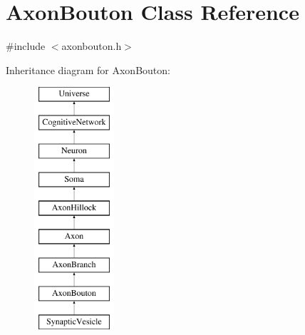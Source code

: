 \hypertarget{classAxonBouton}{}\section{Axon\+Bouton Class Reference}
\label{classAxonBouton}


{\ttfamily \#include $<$axonbouton.\+h$>$}

Inheritance diagram for Axon\+Bouton\+:\begin{figure}[H]
\begin{center}
\leavevmode
\includegraphics[height=9.000000cm]{classAxonBouton}
\end{center}
\end{figure}
